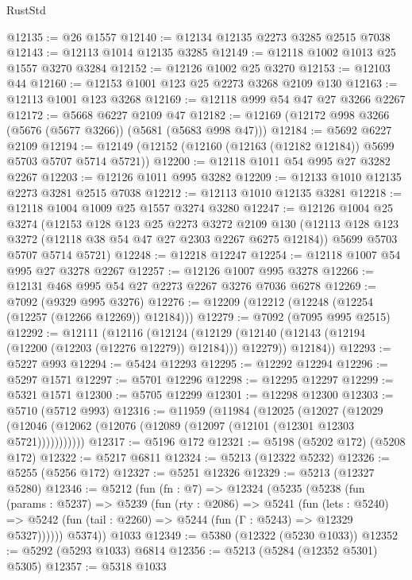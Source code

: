 \begin{lexlean}{RustStd}
\begin{coremodule}
@12135 := @26 @1557
@12140 := @12134 @12135 @2273 @3285 @2515 @7038
@12143 := @12113 @1014 @12135 @3285
@12149 := @12118 @1002 @1013 @25 @1557 @3270 @3284
@12152 := @12126 @1002 @25 @3270
@12153 := @12103 @44
@12160 := @12153 @1001 @123 @25 @2273 @3268 @2109 @130
@12163 := @12113 @1001 @123 @3268
@12169 := @12118 @999 @54 @47 @27 @3266 @2267
@12172 := @5668 @6227 @2109 @47
@12182 := @12169 (@12172 @998 @3266 (@5676 (@5677 @3266)) (@5681 (@5683 @998 @47)))
@12184 := @5692 @6227 @2109
@12194 := @12149 (@12152 (@12160 (@12163 (@12182 @12184)) @5699 @5703 @5707 @5714 @5721))
@12200 := @12118 @1011 @54 @995 @27 @3282 @2267
@12203 := @12126 @1011 @995 @3282
@12209 := @12133 @1010 @12135 @2273 @3281 @2515 @7038
@12212 := @12113 @1010 @12135 @3281
@12218 := @12118 @1004 @1009 @25 @1557 @3274 @3280
@12247 := @12126
    @1004
    @25
    @3274
    (@12153
      @128
      @123
      @25
      @2273
      @3272
      @2109
      @130
      (@12113 @128 @123 @3272 (@12118 @38 @54 @47 @27 @2303 @2267 @6275 @12184))
      @5699
      @5703
      @5707
      @5714
      @5721)
@12248 := @12218 @12247
@12254 := @12118 @1007 @54 @995 @27 @3278 @2267
@12257 := @12126 @1007 @995 @3278
@12266 := @12131 @468 @995 @54 @27 @2273 @2267 @3276 @7036 @6278
@12269 := @7092 (@9329 @995 @3276)
@12276 := @12209 (@12212 (@12248 (@12254 (@12257 (@12266 @12269)) @12184)))
@12279 := @7092 (@7095 @995 @2515)
@12292 := @12111
    (@12116
      (@12124
        (@12129 (@12140 (@12143 (@12194 (@12200 (@12203 (@12276 @12279)) @12184))) @12279))
        @12184))
@12293 := @5227 @993
@12294 := @5424 @12293
@12295 := @12292 @12294
@12296 := @5297 @1571
@12297 := @5701 @12296
@12298 := @12295 @12297
@12299 := @5321 @1571
@12300 := @5705 @12299
@12301 := @12298 @12300
@12303 := @5710 (@5712 @993)
@12316 := @11959
    (@11984
      (@12025
        (@12027
          (@12029 (@12046 (@12062 (@12076 (@12089 (@12097 (@12101 (@12301 @12303 @5721)))))))))))
@12317 := @5196 @172
@12321 := @5198 (@5202 @172) (@5208 @172)
@12322 := @5217 @6811
@12324 := @5213 (@12322 @5232)
@12326 := @5255 (@5256 @172)
@12327 := @5251 @12326
@12329 := @5213 (@12327 @5280)
@12346 := @5212
    (fun (fn : @7) =>
    @12324
      (@5235
        (@5238
          (fun (params : @5237) =>
          @5239
            (fun (rty : @2086) =>
            @5241
              (fun (lets : @5240) =>
              @5242 (fun (tail : @2260) => @5244 (fun (Γ : @5243) => @12329 @5327))))))
        @5374))
    @1033
@12349 := @5380 (@12322 (@5230 @1033))
@12352 := @5292 (@5293 @1033) @6814
@12356 := @5213 (@5284 (@12352 @5301) @5305)
@12357 := @5318 @1033

\end{coremodule}
\end{lexlean}
